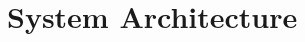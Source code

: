 \documentclass[USenglish]{uit-thesis}
\begin{document}
%

\section{System Architecture}
\label{sec:implementation}
\end{document}
